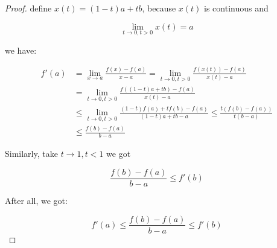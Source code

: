 \documentclass[11pt,a4paper]{article}
\begin{document}
\begin{proof}
    define $x(t) = (1-t)a + tb$, because $x(t)$ is continuous and

    \[
        \lim_{t \to 0, t > 0}x(t) = a
    \]

    we have:

    \begin{align*}
        f'(a) &= \lim_{x \to a} \frac{f(x) - f(a)}{x-a} = \lim_{t \to 0, t > 0}\frac{f(x(t)) - f(a)}{x(t) - a} \\
        &= \lim_{t \to 0, t > 0}\frac{f((1-t)a + tb) - f(a)}{x(t) - a} \\
        & \le \lim_{t \to 0, t > 0}\frac{(1-t)f(a) + tf(b) - f(a)}{(1-t)a + tb - a} \le \frac{t(f(b) -  f(a))}{t(b-a)} \\
        & \le \frac{f(b) - f(a)}{b-a}
    \end{align*}

    Similarly, take $t \to 1, t < 1$ we got

    \[
 \frac{f(b) - f(a)}{b-a}  \le f'(b)
    \]

    After all, we got:

    \[
 f'(a) \le \frac{f(b) - f(a)}{b-a}  \le f'(b)
    \]
\end{proof}
\end{document}
